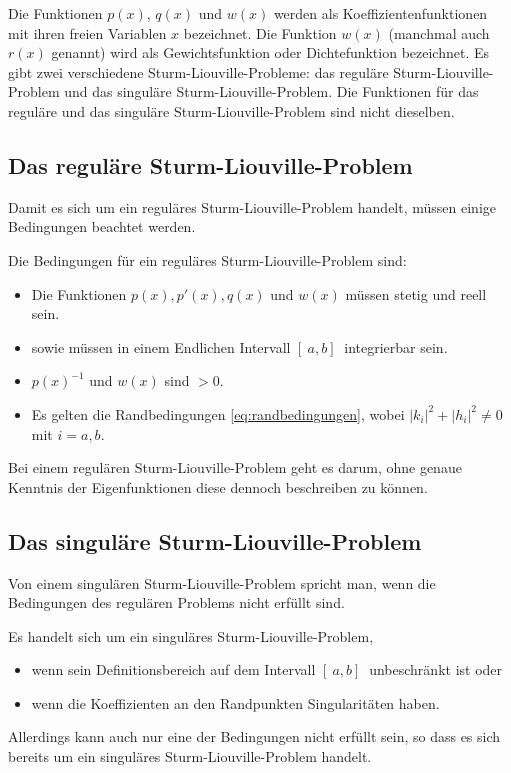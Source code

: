 Die Funktionen $p(x)$, $q(x)$ und $w(x)$ werden als Koeffizientenfunktionen mit ihren freien Variablen $x$ bezeichnet.
Die Funktion $w(x)$ (manchmal auch $r(x)$ genannt) wird als Gewichtsfunktion oder Dichtefunktion bezeichnet.
Es gibt zwei verschiedene Sturm-Liouville-Probleme: das reguläre Sturm-Liouville-Problem und das singuläre Sturm-Liouville-Problem. 
Die Funktionen für das reguläre und das singuläre Sturm-Liouville-Problem sind nicht dieselben.

%
%

\subsection{Das reguläre Sturm-Liouville-Problem\label{sub:reguläre_sturm_liouville_problem}}
Damit es sich um ein reguläres Sturm-Liouville-Problem handelt, müssen einige Bedingungen beachtet werden.
\begin{definition}
	\label{def:reguläres_sturm-liouville-problem}
	Die Bedingungen für ein reguläres Sturm-Liouville-Problem sind:
	\begin{itemize}
		\item Die Funktionen $p(x), p'(x), q(x)$ und $w(x)$ müssen stetig und reell sein.
		\item sowie müssen in einem Endlichen Intervall $[ \ a,b] \ $ integrierbar sein.
		\item $p(x)^{-1}$ und $w(x)$ sind $>0$.
		\item Es gelten die Randbedingungen \ref{eq:randbedingungen}, wobei $|k_i|^2 + |h_i|^2\ne 0$ mit $i=a,b$.
	\end{itemize}
\end{definition}
Bei einem regulären Sturm-Liouville-Problem geht es darum, ohne genaue Kenntnis der Eigenfunktionen diese dennoch beschreiben zu können.


%
%


\subsection{Das singuläre Sturm-Liouville-Problem\label{sub:singuläre_sturm_liouville_problem}}
Von einem singulären Sturm-Liouville-Problem spricht man, wenn die Bedingungen des regulären Problems nicht erfüllt sind.
\begin{definition}
	\label{def:singulär_sturm-liouville-problem}
Es handelt sich um ein singuläres Sturm-Liouville-Problem,
	\begin{itemize}
		\item wenn sein Definitionsbereich auf dem Intervall $[ \ a,b] \ $ unbeschränkt ist oder
		\item wenn die Koeffizienten an den Randpunkten Singularitäten haben.
	\end{itemize}
\end{definition}
Allerdings kann auch nur eine der Bedingungen nicht erfüllt sein, so dass es sich bereits um ein singuläres Sturm-Liouville-Problem handelt.

